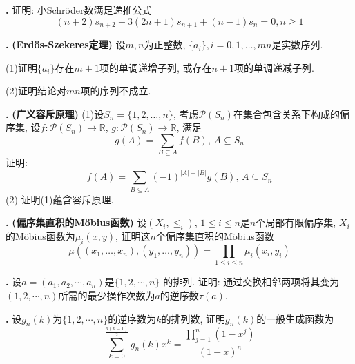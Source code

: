 \par \textbf{\theprobenum .} \cite{IC} 证明: 小Schröder数满足递推公式
\begin{equation}
    (n+2)s_{n+2} -3(2n+1)s_{n+1} +(n-1)s_n = 0, n\ge 1
\end{equation}

\par \textbf{\theprobenum .} \textbf{(Erdös-Szekeres定理)} 设$m,n$为正整数, $\{a_i\}, i=0,1,\dots, mn$是实数序列. 
\par (1)证明$\{a_i\}$存在$m+1$项的单调递增子列, 或存在$n+1$项的单调递减子列. 
\par (2)证明结论对$mn$项的序列不成立. 

\par \textbf{\theprobenum .} \textbf{(广义容斥原理)} (1)设$S_n=\{1,2,\dots,n\}$, 考虑$\mathcal{P}(S_n)$在集合包含关系下构成的偏序集, 设$f: \mathcal{P}(S_n)\to \mathbb{R}$, $g: \mathcal{P}(S_n)\to \mathbb{R}$, 满足
\begin{equation}
    g(A)=\sum_{B\subseteq A} f(B),\, A\subseteq S_n
\end{equation}
证明: 
\begin{equation}
    f(A)=\sum_{B\subseteq A} (-1)^{|A|-|B|}g(B), \, A\subseteq S_n
\end{equation}
(2) 证明(1)蕴含容斥原理. 

\par \textbf{\theprobenum .} \textbf{(偏序集直积的Möbius函数)} 设$(X_i, \le_i)$, $1\le i\le n$是$n$个局部有限偏序集, $X_i$的Möbius函数为$\mu_i(x,y)$, 证明这$n$个偏序集直积的Möbius函数
\begin{equation}
    \mu((x_1,\dots,x_n), (y_1,\dots,y_n))=\prod_{1\le i\le n} \mu_i(x_i, y_i)
\end{equation}

\par \textbf{\theprobenum .} \cite{IC} 设$a=(a_1, a_2,\cdots,a_n)$是$\{1,2,\cdots,n\}$ 的排列. 证明: 通过交换相邻两项将其变为$(1,2,\cdots,n)$所需的最少操作次数为$a$的逆序数$\tau(a)$. 

\par \textbf{\theprobenum .} \cite{IC} 设$g_n(k)$为$\{1,2,\cdots,n\}$的逆序数为$k$的排列数, 证明$g_n(k)$的一般生成函数为
\begin{equation}
    \sum_{k=0}^{\frac{n(n-1)}{2}} g_n(k)x^k = \frac{\prod_{j=1}^n (1-x^j)}{(1-x)^n}
\end{equation}

